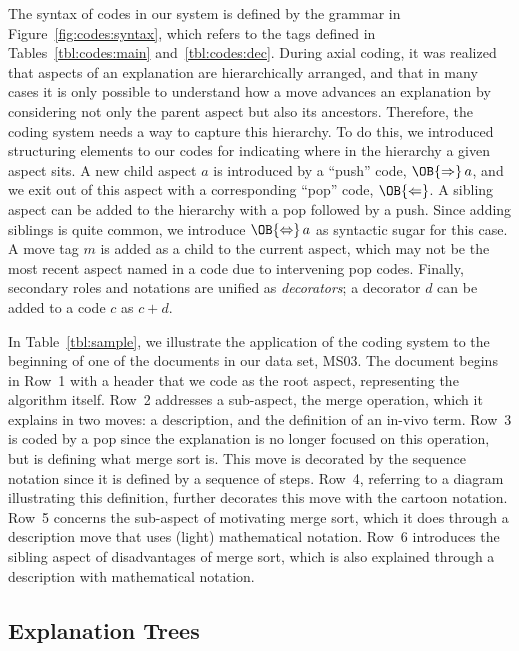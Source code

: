 \documentclass[sigconf]{acmart}
\newcommand{\Push}{\OB{\Rightarrow}}
\newcommand{\Pop}{\OB{\Leftarrow}}
\newcommand{\PopPush}{\OB{\Leftrightarrow}}
\begin{document}
The syntax of codes in our system is defined by the grammar in
Figure~\ref{fig:codes:syntax}, which refers to the tags defined in
Tables~\ref{tbl:codes:main} and~\ref{tbl:codes:dec}.
%
During axial coding, it was realized that aspects of an explanation are
hierarchically arranged, and that in many cases it is only possible to
understand how a move advances an explanation by considering not only the
parent aspect but also its ancestors.
%
Therefore, the coding system needs a way to capture this hierarchy. To do this,
we introduced structuring elements to our codes for indicating where in the
hierarchy a given aspect sits.
%
A new child aspect $a$ is introduced by a ``push'' code, $\Push\,a$, and we
exit out of this aspect with a corresponding ``pop'' code, $\Pop$. A sibling
aspect can be added to the hierarchy with a pop followed by a push. Since
adding siblings is quite common, we introduce $\PopPush\,a$ as syntactic sugar
for this case.
%
A move tag $m$ is added as a child to the current aspect, which may not be the
most recent aspect named in a code due to intervening pop codes.
%
Finally, secondary roles and notations are unified as \emph{decorators}; a
decorator $d$ can be added to a code $c$ as $c+d$.





In Table~\ref{tbl:sample}, we illustrate the application of the coding system
to the beginning of one of the documents in our data set, MS03.
%
The document begins in Row~1 with a header that we code as the root aspect,
representing the algorithm itself. Row~2 addresses a sub-aspect, the merge
operation, which it explains in two moves: a description, and the definition of
an in-vivo term.
%
Row~3 is coded by a pop since the explanation is no longer focused on this
operation, but is defining what merge sort is. This move is decorated by the
sequence notation since it is defined by a sequence of steps.
%
Row~4, referring to a diagram illustrating this definition, further decorates
this move with the cartoon notation.
%
Row~5 concerns the sub-aspect of motivating merge sort, which it does through a
description move that uses (light) mathematical notation.
%
Row~6 introduces the sibling aspect of disadvantages of merge sort, which is
also explained through a description with mathematical notation.



\subsection{Explanation Trees}
\label{sec:res:xopTree}
\end{document}
